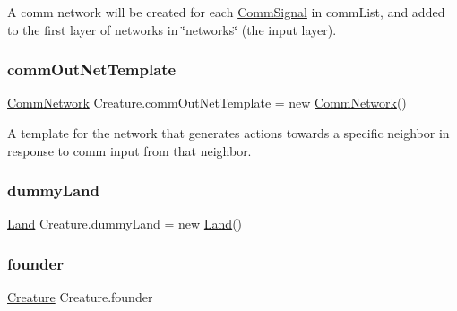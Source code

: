 A comm network will be created for each \mbox{\hyperlink{class_comm_signal}{Comm\+Signal}} in comm\+List, and added to the first layer of networks in \char`\"{}networks\char`\"{} (the input layer). 

\mbox{\label{class_creature_ac17368a07178415519592669a89283bd}} 
\subsubsection{\texorpdfstring{comm\+Out\+Net\+Template}{commOutNetTemplate}}
{\footnotesize\ttfamily \mbox{\hyperlink{class_comm_network}{Comm\+Network}} Creature.\+comm\+Out\+Net\+Template = new \mbox{\hyperlink{class_comm_network}{Comm\+Network}}()}



A template for the network that generates actions towards a specific neighbor in response to comm input from that neighbor. 

\mbox{\label{class_creature_a08982d1959e230238389a1a5e9853115}} 
\subsubsection{\texorpdfstring{dummy\+Land}{dummyLand}}
{\footnotesize\ttfamily \mbox{\hyperlink{class_land}{Land}} Creature.\+dummy\+Land = new \mbox{\hyperlink{class_land}{Land}}()}

\mbox{\label{class_creature_ab689ebff012f90395825a404bd6990c6}} 
\subsubsection{\texorpdfstring{founder}{founder}}
{\footnotesize\ttfamily \mbox{\hyperlink{class_creature}{Creature}} Creature.\+founder}

\mbox{\label{class_creature_a64066d7d20c1b74af7e2e8a5bd8e2410}} 
